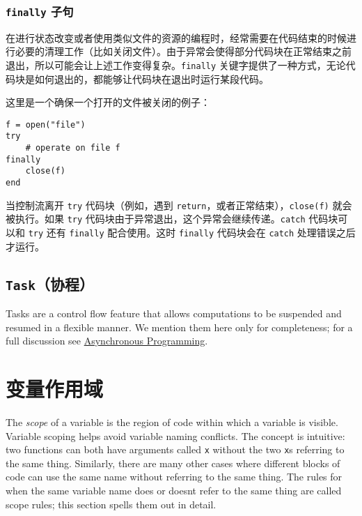 \hypertarget{13560047635024894791}{}


\subsection{\texttt{finally} 子句}



在进行状态改变或者使用类似文件的资源的编程时，经常需要在代码结束的时候进行必要的清理工作（比如关闭文件）。由于异常会使得部分代码块在正常结束之前退出，所以可能会让上述工作变得复杂。\texttt{finally} 关键字提供了一种方式，无论代码块是如何退出的，都能够让代码块在退出时运行某段代码。



这里是一个确保一个打开的文件被关闭的例子：




\begin{verbatim}
f = open("file")
try
    # operate on file f
finally
    close(f)
end
\end{verbatim}



当控制流离开 \texttt{try} 代码块（例如，遇到 \texttt{return}，或者正常结束），\texttt{close(f)} 就会被执行。如果 \texttt{try} 代码块由于异常退出，这个异常会继续传递。\texttt{catch} 代码块可以和 \texttt{try} 还有 \texttt{finally} 配合使用。这时 \texttt{finally} 代码块会在 \texttt{catch} 处理错误之后才运行。



\hypertarget{15038256797533490288}{}


\section{\texttt{Task}（协程）}



Tasks are a control flow feature that allows computations to be suspended and resumed in a flexible manner. We mention them here only for completeness; for a full discussion see \href{@ref man-asynchronous}{Asynchronous Programming}.



\hypertarget{14993622729045334657}{}


\chapter{变量作用域}



The \emph{scope} of a variable is the region of code within which a variable is visible. Variable scoping helps avoid variable naming conflicts. The concept is intuitive: two functions can both have arguments called \texttt{x} without the two \texttt{x}{\textquotesingle}s referring to the same thing. Similarly, there are many other cases where different blocks of code can use the same name without referring to the same thing. The rules for when the same variable name does or doesn{\textquotesingle}t refer to the same thing are called scope rules; this section spells them out in detail.



